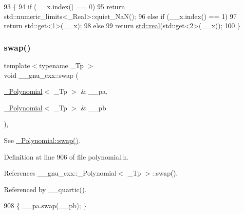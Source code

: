 \begin{DoxyCode}
93     \{
94       \textcolor{keywordflow}{if} (\_\_x.index() == 0)
95         \textcolor{keywordflow}{return} std::numeric\_limits<\_Real>::quiet\_NaN();
96       \textcolor{keywordflow}{else} \textcolor{keywordflow}{if} (\_\_x.index() == 1)
97         \textcolor{keywordflow}{return} std::get<1>(\_\_x);
98       \textcolor{keywordflow}{else}
99         \textcolor{keywordflow}{return} \hyperlink{namespace____gnu__cxx_a2743043701f8e4c87d3f0f06ddb11348}{std::real}(std::get<2>(\_\_x));
100     \}
\end{DoxyCode}
\mbox{\label{namespace____gnu__cxx_a10d002d78eb10d846416335ca9599c7a}} 
\subsubsection{\texorpdfstring{swap()}{swap()}}
{\footnotesize\ttfamily template$<$typename \+\_\+\+Tp $>$ \\
void \+\_\+\+\_\+gnu\+\_\+cxx\+::swap (\begin{DoxyParamCaption}\item[{\hyperlink{class____gnu__cxx_1_1__Polynomial}{\+\_\+\+Polynomial}$<$ \+\_\+\+Tp $>$ \&}]{\+\_\+\+\_\+pa,  }\item[{\hyperlink{class____gnu__cxx_1_1__Polynomial}{\+\_\+\+Polynomial}$<$ \+\_\+\+Tp $>$ \&}]{\+\_\+\+\_\+pb }\end{DoxyParamCaption})\hspace{0.3cm}{\ttfamily [inline]}, {\ttfamily [noexcept]}}

See \hyperlink{class____gnu__cxx_1_1__Polynomial_aec8b248101f7340d46fbac13b07b45bc}{\+\_\+\+Polynomial\+::swap()}. 

Definition at line 906 of file polynomial.\+h.



References \+\_\+\+\_\+gnu\+\_\+cxx\+::\+\_\+\+Polynomial$<$ \+\_\+\+Tp $>$\+::swap().



Referenced by \+\_\+\+\_\+quartic().


\begin{DoxyCode}
908     \{ \_\_pa.swap(\_\_pb); \}
\end{DoxyCode}
\mbox{\label{namespace____gnu__cxx_aa21adeccc5b87713003459ab7f08fc7b}} 
